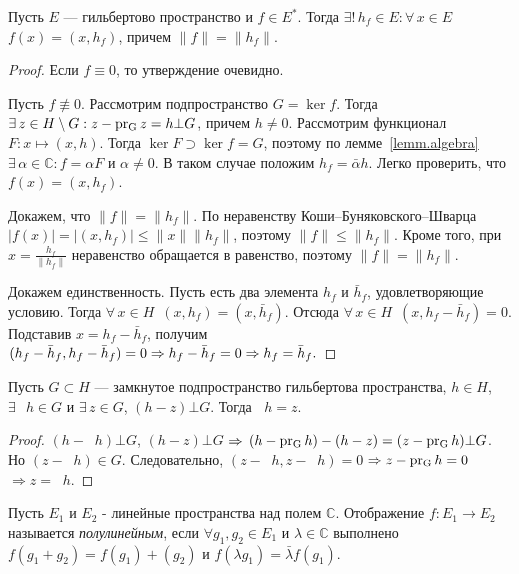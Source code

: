 \documentclass[10pt]{article}
\newcommand*{\p}[1]{#1\nobreak\discretionary{}{\hbox{$\mathsurround=0pt #1$}}{}}
\newcommand*{\pr}[1]{\mathop{\mathrm{pr_{#1}}}}
\begin{document}
\begin{theorem}[Рисс]
Пусть $E$ --- гильбертово пространство и $f\in E^*$. Тогда
$\exists!\,h_f\in E:\forall\,x\in E$\;\;$f(x)=(x,h_f)$, причем
$\|f\|=\|h_f\|$.
\end{theorem}

\begin{proof}
Если $f\equiv0$, то утверждение очевидно.

Пусть $f\not\equiv 0$. Рассмотрим подпространство $G=\ker f$. Тогда
$\exists\,z\p\in H\setminus G:z-\pr{G}z=h\bot G$, причем $h\neq 0$.
Рассмотрим функционал $F\colon x\mapsto (x,h)$. Тогда $\ker F\supset
\ker f=G$, поэтому по лемме~\ref{lemm.algebra}
$\exists\,\alpha\in\mathbb{C}: f=\alpha F$ и $\alpha\neq 0$. В таком
случае положим $h_f=\bar{\alpha}h$. Легко проверить, что
$f(x)=(x,h_f)$.

Докажем, что $\|f\|=\|h_f\|$. По неравенству
Коши--Буняковского--Шва\-рца
$|f(x)|=|(x,h_f)|\leqslant\|x\|\|h_f\|$, поэтому
$\|f\|\leqslant\|h_f\|$. Кроме того, при $x=\frac{h_f}{\|h_f\|}$
неравенство обращается в равенство, поэтому $\|f\|=\|h_f\|$.

Докажем единственность. Пусть есть два элемента $h_f$ и $\bar{h}_f$,
удовлетворяющие условию. Тогда $\forall\,x\in H$\
$(x,h_f)=(x,\bar{h}_f)$. Отсюда $\forall\,x\in H$\
$(x,h_f-\bar{h}_f)=0$. Подставив $x=h_f-\bar{h}_f$, получим
$(h_f-\bar{h}_f,h_f-\bar{h}_f)=0\p\Rightarrow
h_f-\bar{h}_f=0\Rightarrow h_f=\bar{h}_f.$
\end{proof}



\begin{theorem}
Пусть $G\subset H$ --- замкнутое подпространство гильбертова
пространства, $h\in H$, $\exists\, \pr{G}h\in G $ и $\exists\,z\in
G$, $(h-z)\bot G$. Тогда $\pr{G}h=z$.
\end{theorem}

\begin{proof}
$(h-\pr{G}h)\bot G$, $(h-z)\bot G$ $\p\Rightarrow$
$(h-\pr{G}h)-(h-z)=(z\p-\pr{G}h)\bot G$. Но $(z-\pr{G}h)\in G$.
Следовательно, $(z-\pr{G}h,z-\pr{G}h)=0\;$$ \p\Rightarrow
z-\pr{G}h=0\;$$\Rightarrow z=\pr{G}h$.
\end{proof}

\begin{df}
Пусть $E_1$ и $E_2$ - линейные пространства над полем $\mathbb{C}$.
Отображение $f:E_1\rightarrow E_2$ называется \emph{полулинейным},
если $\forall g_1, g_2\in E_1$ и $\lambda \in \mathbb{C}$ выполнено
$f(g_1+g_2)=f(g_1)+(g_2)$ и $f(\lambda g_1)=\bar{\lambda} f(g_1)$.
\end{df}
\end{document}
